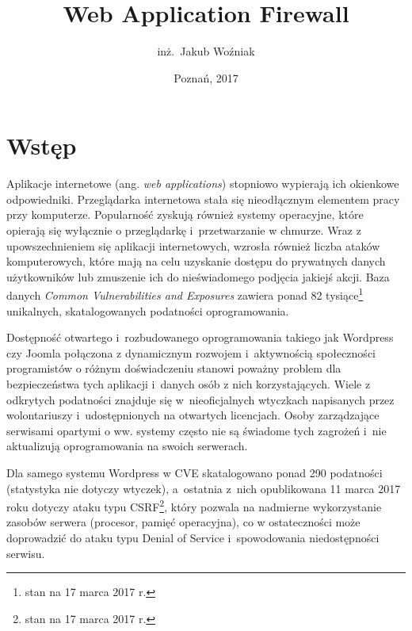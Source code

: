 \documentclass[11pt,a4paper,polish,thesis]{dcsbook}
\begin{document}
\author{inż.~Jakub Woźniak}
\title{Web Application Firewall}
\date{Poznań, 2017}
\maketitle
\frontmatter
\tableofcontents
\mainmatter


\chapter{Wstęp}

Aplikacje internetowe (ang. \textit{web applications}) stopniowo wypierają ich okienkowe odpowiedniki. Przeglądarka internetowa stała się nieodłącznym elementem pracy przy komputerze. Popularność zyskują również systemy operacyjne, które opierają się wyłącznie o przeglądarkę i~przetwarzanie w chmurze. Wraz z upowszechnieniem się aplikacji internetowych, wzrosła również liczba ataków komputerowych, które mają na celu uzyskanie dostępu do prywatnych danych użytkowników lub zmuszenie ich do nieświadomego podjęcia jakiejś akcji. Baza danych \textit{Common Vulnerabilities and Exposures}\cite{cve} zawiera ponad 82 tysiące\footnote{stan na 17 marca 2017 r.} unikalnych, skatalogowanych podatności oprogramowania.

Dostępność otwartego i~rozbudowanego oprogramowania takiego jak Wordpress\cite{wordpress} czy Joomla\cite{joomla} połączona z dynamicznym rozwojem i~aktywnością społeczności programistów o różnym doświadczeniu stanowi poważny problem dla bezpieczeństwa tych aplikacji i~danych osób z nich korzystających. Wiele z odkrytych podatności znajduje się w~nieoficjalnych wtyczkach napisanych przez wolontariuszy i~udostępnionych na otwartych licencjach. Osoby zarządzające serwisami opartymi o ww. systemy często nie są świadome tych zagrożeń i~nie aktualizują oprogramowania na swoich serwerach. 

Dla samego systemu Wordpress w CVE skatalogowano ponad 290 podatności (statystyka nie dotyczy wtyczek), a~ostatnia z~nich opublikowana 11 marca 2017 roku dotyczy ataku typu CSRF\footnote{stan na 17 marca 2017 r.}, który pozwala na nadmierne wykorzystanie zasobów serwera (procesor, pamięć operacyjna), co w ostateczności może doprowadzić do ataku typu Denial of Service i~spowodowania niedostępności serwisu.
\end{document}
